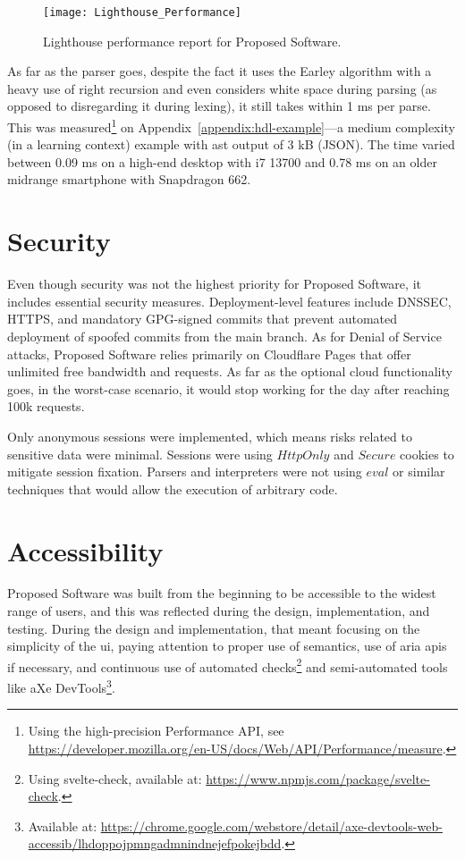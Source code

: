 \begin{figure}[H]
    \centering
    \texttt{[image: Lighthouse\_Performance]}
    \caption{Lighthouse performance report for Proposed Software.}
    \label{fig:design-lighthouse-performance}
\end{figure}

As far as the parser goes, despite the fact it uses the Earley algorithm with a heavy use of right recursion and even considers white space during parsing (as opposed to disregarding it during lexing), it still takes within 1 ms per parse.
This was measured\footnote{Using the high-precision Performance API, see \url{https://developer.mozilla.org/en-US/docs/Web/API/Performance/measure}.} on Appendix~\ref{appendix:hdl-example}---a medium complexity (in a learning context) example with \gls{ast} output of 3 kB (JSON).
The time varied between 0.09 ms on a high-end desktop with i7 13700 and 0.78 ms on an older midrange smartphone with Snapdragon 662.

\section{Security}

Even though security was not the highest priority for Proposed Software, it includes essential security measures.
Deployment-level features include DNSSEC, HTTPS, and mandatory GPG-signed commits that prevent automated deployment of spoofed commits from the main branch.
As for Denial of Service attacks, Proposed Software relies primarily on Cloudflare Pages that offer unlimited free bandwidth and requests.
As far as the optional cloud functionality goes, in the worst-case scenario, it would stop working for the day after reaching 100k requests.

Only anonymous sessions were implemented, which means risks related to sensitive data were minimal.
Sessions were using $HttpOnly$ and $Secure$ cookies to mitigate session fixation.
Parsers and interpreters were not using $eval$ or similar techniques that would allow the execution of arbitrary code.

\section{Accessibility}

Proposed Software was built from the beginning to be accessible to the widest range of users, and this was reflected during the design, implementation, and testing.
During the design and implementation, that meant focusing on the simplicity of the \gls{ui}, paying attention to proper use of semantics, use of \gls{aria} \glspl{api} if necessary, and continuous use of automated checks\footnote{Using svelte-check, available at: \url{https://www.npmjs.com/package/svelte-check}.} and semi-automated tools like aXe DevTools\footnote{Available at: \url{https://chrome.google.com/webstore/detail/axe-devtools-web-accessib/lhdoppojpmngadmnindnejefpokejbdd}.}.

